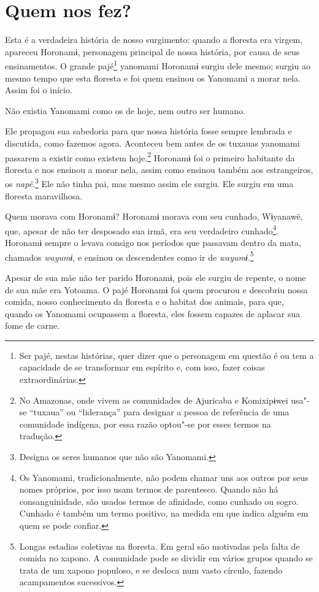  

\section{Quem nos fez?}

Esta é a verdadeira história de nosso surgimento: quando a floresta era
virgem, apareceu Horonamɨ, personagem principal de nossa história, por
causa de seus ensinamentos. O grande pajé\footnote{  Ser pajé, nestas histórias, quer dizer que o personagem em questão é ou
tem a capacidade de se transformar em espírito e, com isso, fazer coisas
extraordinárias.}  yanomami
Horonamɨ surgiu dele mesmo; surgiu ao mesmo tempo que esta floresta e
foi quem ensinou os Yanomami a morar nela. Assim foi o início. 

Não existia Yanomami como os de hoje, nem outro ser humano. 

Ele propagou sua sabedoria para que nossa história fosse sempre lembrada
e discutida, como fazemos agora. Aconteceu bem antes de os tuxauas
yanomami passarem a existir como existem
hoje.\footnote{  No Amazonas, onde vivem as comunidades de Ajuricaba e Komixipɨwei
usa"-se ``tuxaua'' ou ``liderança'' para designar a pessoa de referência
de uma comunidade indígena, por essa razão optou"-se por esses termos na
tradução.}  Horonamɨ foi o primeiro habitante da floresta e
nos ensinou a morar nela, assim como ensinou também aos estrangeiros,
os \emph{napë}.\footnote{   Designa os seres humanos que não são Yanomami.}  Ele não tinha pai, mas mesmo assim
ele surgiu. Ele surgiu em uma floresta maravilhosa. 

Quem morava com Horonamɨ? Horonamɨ morava com seu cunhado, Wɨyanawë,
que, apesar de não ter desposado sua irmã, era seu verdadeiro
cunhado\footnote{  Os Yanomami, tradicionalmente, não podem chamar uns aos outros por seus
nomes próprios, por isso usam termos de parentesco. Quando não há
consanguinidade, são usados termos de afinidade, como cunhado ou sogro.
Cunhado é também um termo positivo, na medida em que indica alguém em
quem se pode confiar.}. Horonamɨ sempre o levava consigo nos
períodos que passavam dentro da mata, chamados \emph{wayumɨ}, e ensinou
os descendentes como ir de \emph{wayumɨ}.\footnote{   Longas estadias coletivas na floresta. Em geral são motivadas pela
falta de comida no xapono. A comunidade pode se dividir em vários grupos
quando se trata de um xapono populoso, e se desloca num vasto círculo,
fazendo acampamentos sucessivos.}

Apesar de sua mãe não ter parido Horonamɨ, pois ele surgiu de repente, o
nome de sua mãe era Yotoama. O pajé Horonamɨ foi quem procurou e
descobriu nossa comida, nosso conhecimento da floresta e o habitat dos
animais, para que, quando os Yanomami ocupassem a floresta, eles fossem
capazes de aplacar sua fome de carne. 

